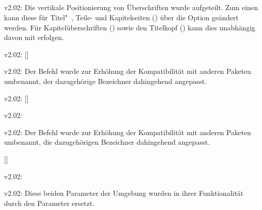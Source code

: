 \subsection{}
\begin{Obsolete}{v2.02:}{}
\printobsoletelist%
%
Die vertikale Positionierung von Überschriften wurde aufgeteilt. Zum einen kann 
diese für Titel"~, Teile- und Kapitelseiten () über 
die Option  geändert werden. Für Kapitelüberschriften
() sowie den Titelkopf () 
kann dies unabhängig davon mit  erfolgen.
\end{Obsolete}

\begin{Obsolete}{v2.02:}{%
  []%
}
\begin{Obsolete}{v2.02:}{}
\printobsoletelist%
%
Der Befehl wurde zur Erhöhung der Kompatibilität mit anderen Paketen umbenannt, 
der dazugehörige Bezeichner dahingehend angepasst.
\end{Obsolete}
\end{Obsolete}

\begin{Obsolete}{v2.02:}{%
  []%
}
\begin{Obsolete}{v2.02:}{}
\begin{Obsolete}{v2.02:}{}
\printobsoletelist%
%
Der Befehl wurde zur Erhöhung der Kompatibilität mit anderen Paketen umbenannt, 
die dazugehörigen Bezeichner dahingehend angepasst.
\end{Obsolete}
\end{Obsolete}
\end{Obsolete}

\begin{Obsolete}{}{[]}
\begin{Obsolete}{v2.02:}{%
}
\begin{Obsolete}{v2.02:}{%
}
\printobsoletelist%
%
Diese beiden Parameter der Umgebung  wurden in ihrer 
Funktionalität durch den Parameter  
ersetzt.
\end{Obsolete}
\end{Obsolete}
\end{Obsolete}




